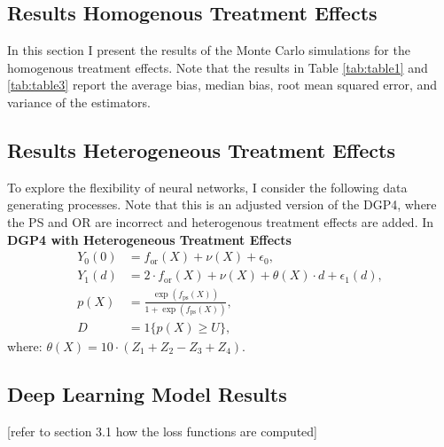 \subsection{Results Homogenous Treatment Effects}



In this section I present the results of the Monte Carlo simulations for the homogenous treatment effects.
Note that the results in Table \ref{tab:table1}  and \ref{tab:table3} report the average bias, median bias, root mean squared error, and variance of the estimators.





\subsection{Results Heterogeneous Treatment Effects}
To explore the flexibility of neural networks, I consider the following data generating processes. Note that this is an adjusted version of the DGP4, where the PS and OR are incorrect and heterogenous treatment effects are added. In \\
\textbf{DGP4 with Heterogeneous Treatment Effects}
\begin{align*}
    Y_0(0) &= f_{\text{or}}(X) + \nu(X) + \epsilon_0, \\
    Y_1(d) &= 2 \cdot f_{\text{or}}(X) + \nu(X) + \theta(X) \cdot d + \epsilon_1(d), \\
    p(X) &= \frac{\exp \left( f_{\text{ps}}(X) \right)}{1 + \exp \left( f_{\text{ps}}(X) \right)}, \\
    D &= 1\{ p(X) \geq U \},
\end{align*}
where: $\theta(X) = 10 \cdot (Z_1 + Z_2 - Z_3 + Z_4)$.



\subsection{Deep Learning Model Results}
[refer to section 3.1 how the loss functions are computed]


